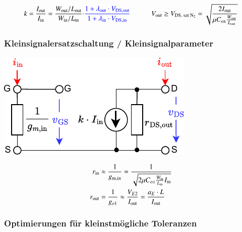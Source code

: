 \vspace{-0.2cm}

\[
    k = \frac{I_\text{out}}{I_\text{in}} = \frac{W_\text{out}/L_\text{out}}{W_\text{in}/L_\text{in}} {\color{blue} \cdot \frac{1 + \lambda_{\rm out} \cdot V_{\rm DS,out}}{1 + \lambda_{\rm in} \cdot V_{\rm DS,in}} }   \qquad \quad
    V_\text{out} \geq V_\text{DS, sat $\text{N}_2$} = \sqrt{\frac{2 I_\text{out}}{\mu C_\text{ox}\frac{W_{\rm out}}{L_{\rm out}}}}
\]

\subsubsection{Kleinsignalersatzschaltung / Kleinsignalparameter}

\begin{minipage}[t]{0.48\columnwidth}
    \includegraphics[width=\columnwidth, align=t]{images/06_stromspiegel_kleinsignalersatzschaltung.pdf}
\end{minipage}
\hfill
\begin{minipage}[t]{0.48\columnwidth}

    \begin{align*}
        r_{\rm in}  &\approx \frac{1}{g_{\rm m, in}} = \frac{1}{\sqrt{2 \mu C_{ox} \frac{W_{\rm in}}{L_{\rm in}} I_{\rm in}}} \\
        r_{\rm out} &= \frac{1}{g_{o1}} \approx \frac{V_{E2}}{I_{\rm out}} = \frac{a_E \cdot L}{I_{\rm out}}
    \end{align*}
    

\end{minipage}


\subsubsection{Optimierungen für kleinstmögliche Toleranzen}

